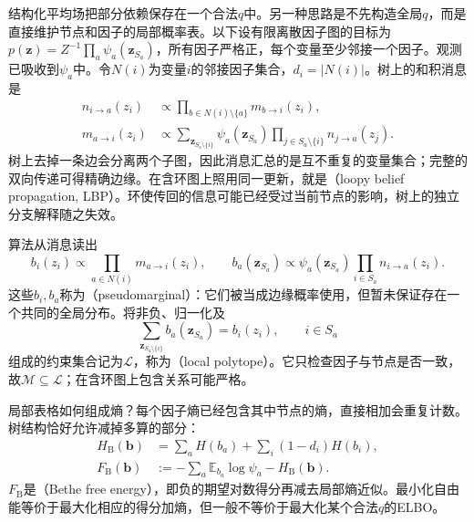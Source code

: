 结构化平均场把部分依赖保存在一个合法$q$中。另一种思路是不先构造全局$q$，而是直接维护节点和因子的局部概率表。以下设有限离散因子图的目标为$p(\bm z)=Z^{-1}\prod_a\psi_a(\bm z_{S_a})$，所有因子严格正，每个变量至少邻接一个因子。观测已吸收到$\psi_a$中。令$N(i)$为变量$i$的邻接因子集合，$d_i=|N(i)|$。树上的和积消息是
\begin{equation}
  \begin{aligned}
    n_{i\to a}(z_i)
      &\propto\prod_{b\in N(i)\setminus\{a\}}m_{b\to i}(z_i),\\
    m_{a\to i}(z_i)
      &\propto\sum_{\bm z_{S_a\setminus\{i\}}}
            \psi_a(\bm z_{S_a})
            \prod_{j\in S_a\setminus\{i\}}n_{j\to a}(z_j).
  \end{aligned}
  \label{eq:pgm-variational-lbp}
\end{equation}
树上去掉一条边会分离两个子图，因此消息汇总的是互不重复的变量集合；完整的双向传递可得精确边缘。在含环图上照用同一更新，就是（loopy belief propagation, LBP）。环使传回的信息可能已经受过当前节点的影响，树上的独立分支解释随之失效。

算法从消息读出
\[
  b_i(z_i)\propto\prod_{a\in N(i)}m_{a\to i}(z_i),
  \qquad
  b_a(\bm z_{S_a})\propto\psi_a(\bm z_{S_a})
                         \prod_{i\in S_a}n_{i\to a}(z_i).
\]
这些$b_i,b_a$称为（pseudomarginal）：它们被当成边缘概率使用，但暂未保证存在一个共同的全局分布。将非负、归一化及
\begin{equation}
  \sum_{\bm z_{S_a\setminus\{i\}}}b_a(\bm z_{S_a})=b_i(z_i),
  \qquad i\in S_a
  \label{eq:pgm-variational-local-consistency}
\end{equation}
组成的约束集合记为$\mathcal L$，称为（local polytope）。它只检查因子与节点是否一致，故$\mathcal M\subseteq\mathcal L$；在含环图上包含关系可能严格。

局部表格如何组成熵？每个因子熵已经包含其中节点的熵，直接相加会重复计数。树结构恰好允许减掉多算的部分：
\begin{equation}
  \begin{aligned}
    H_{\mathrm B}(\bm b)
      &=\sum_aH(b_a)+\sum_i(1-d_i)H(b_i),\\
    F_{\mathrm B}(\bm b)
      &:=-\sum_a\mathbb E_{b_a}\log\psi_a-H_{\mathrm B}(\bm b).
  \end{aligned}
  \label{eq:pgm-variational-bethe}
\end{equation}
$F_{\mathrm B}$是（Bethe free energy），即负的期望对数得分再减去局部熵近似。最小化自由能等价于最大化相应的得分加熵，但一般不等价于最大化某个合法$q$的ELBO。

